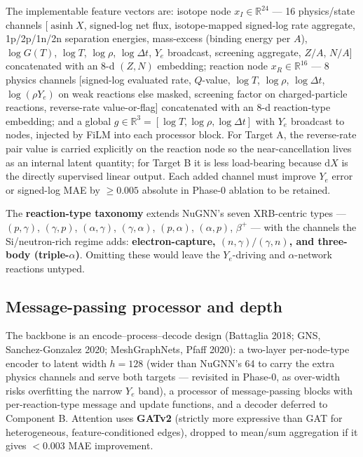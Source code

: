 \documentclass[11pt]{article}
\DeclareMathOperator{\asinh}{asinh}
\newcommand{\Ye}{Y_{e}}
\newcommand{\dd}{\mathrm{d}}
\begin{document}
The implementable feature vectors are: isotope node $x_I \in \mathbb{R}^{24}$ --- 16 physics/state channels [$\asinh X$, signed-log net flux, isotope-mapped signed-log rate aggregate, 1p/2p/1n/2n separation energies, mass-excess (binding energy per $A$), $\log G(T)$, $\log T$, $\log\rho$, $\log\Delta t$, $\Ye$ broadcast, screening aggregate, $Z/A$, $N/A$] concatenated with an 8-d $(Z,N)$ embedding; reaction node $x_R \in \mathbb{R}^{16}$ --- 8 physics channels [signed-log evaluated rate, $Q$-value, $\log T$, $\log\rho$, $\log\Delta t$, $\log(\rho\Ye)$ on weak reactions else masked, screening factor on charged-particle reactions, reverse-rate value-or-flag] concatenated with an 8-d reaction-type embedding; and a global $g \in \mathbb{R}^{3} = [\log T, \log\rho, \log\Delta t]$ with $\Ye$ broadcast to nodes, injected by FiLM into each processor block. For Target A, the reverse-rate pair value is carried explicitly on the reaction node so the near-cancellation lives as an internal latent quantity; for Target B it is less load-bearing because $\dd X$ is the directly supervised linear output. Each added channel must improve $\Ye$ error or signed-log MAE by $\ge 0.005$ absolute in Phase-0 ablation to be retained.

The \textbf{reaction-type taxonomy} extends NuGNN's seven XRB-centric types --- $(p,\gamma)$, $(\gamma,p)$, $(\alpha,\gamma)$, $(\gamma,\alpha)$, $(p,\alpha)$, $(\alpha,p)$, $\beta^{+}$ --- with the channels the Si/neutron-rich regime adds: \textbf{electron-capture, $(n,\gamma)/(\gamma,n)$, and three-body (triple-$\alpha$)}. Omitting these would leave the $\Ye$-driving and $\alpha$-network reactions untyped.

\subsection{Message-passing processor and depth}

The backbone is an encode--process--decode design (Battaglia 2018; GNS, Sanchez-Gonzalez 2020; MeshGraphNets, Pfaff 2020): a two-layer per-node-type encoder to latent width \textbf{$h = 128$} (wider than NuGNN's 64 to carry the extra physics channels and serve both targets --- revisited in Phase-0, as over-width risks overfitting the narrow $\Ye$ band), a processor of message-passing blocks with per-reaction-type message and update functions, and a decoder deferred to Component B. Attention uses \textbf{GATv2} (strictly more expressive than GAT for heterogeneous, feature-conditioned edges), dropped to mean/sum aggregation if it gives $<0.003$ MAE improvement.
\end{document}
